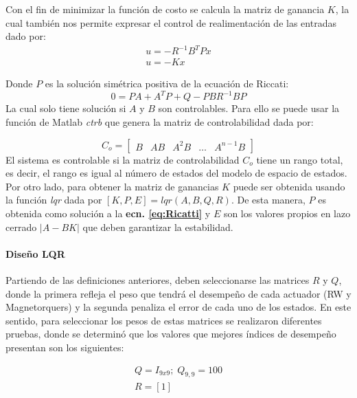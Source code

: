 Con el fin de minimizar la función de costo se calcula la matriz de ganancia $K$, la cual también nos permite expresar el control de realimentación de las entradas dado por:
\begin{gather}\label{eq:K_entradas}
	u = -R^{-1}B^{T}Px\\[10pt]
	u = -Kx
\end{gather}

Donde $P$ es la solución simétrica positiva de la ecuación de Riccati:  
\begin{equation}\label{eq:Ricatti}
 	0 = PA + A^{T}P +Q -PBR^{-1}BP
\end{equation}
La cual solo tiene solución si $A$ y $B$ son controlables. Para ello se puede usar la función de Matlab \textit{ctrb} que genera la matriz de controlabilidad dada por:

\begin{equation}\label{eq:controlabilidad}
	C_o =\left[\begin{array}{lllll}
		B & AB & A^2B &\ldots & A^{n-1}B
	\end{array}\right]
\end{equation}
El sistema es controlable si la matriz de controlabilidad $C_o$ tiene un rango total, es decir, el rango es igual al número de estados del modelo de espacio de estados. Por otro lado, para obtener la matriz de ganancias $K$ puede ser obtenida usando la función \textit{lqr} dada por $[K,P,E] = lqr(A,B,Q,R)$. De esta manera, $P$ es obtenida como solución a la \textbf{ecn. \eqref{eq:Ricatti}} y $E$ son los valores propios en lazo cerrado $\lvert A-BK\rvert$ que deben garantizar la estabilidad. 

\paragraph{Diseño LQR}
Partiendo de las definiciones anteriores, deben seleccionarse las matrices $R$ y $Q$, donde la primera refleja el peso que tendrá el desempeño de cada actuador (RW y Magnetorquers) y la segunda penaliza el error de cada uno de los estados. En este sentido, para seleccionar los pesos de estas matrices se realizaron diferentes pruebas, donde se determinó que los valores que mejores índices de desempeño presentan son los siguientes: 

\begin{equation}
	\begin{gathered}
		Q = I_{9x9};
		\;Q_{9,9} = 100\\
		R=[1]
	\end{gathered}	
\end{equation}

